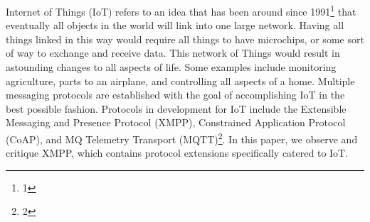 Internet of Things (IoT) refers to an idea that has been around since 1991\footnote{1} 
that eventually all objects in the world will link into one large network. Having all things linked in this way would require all things to have microchips, or some sort of way to exchange and receive data. This network of Things would result in astounding changes to all aspects of life. Some examples include monitoring agriculture, parts to an airplane, and controlling all aspects of a home.
Multiple messaging protocols are established with the goal of accomplishing IoT in the best possible fashion. Protocols in development for IoT include the Extensible Messaging and Presence Protocol (XMPP), Constrained Application Protocol (CoAP), and MQ Telemetry Transport (MQTT)\footnote{2}. In this paper, we observe and critique XMPP, which contains protocol extensions specifically catered to IoT.
